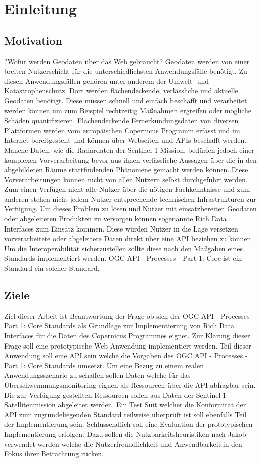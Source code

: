 \newpage
\restoregeometry
\section{Einleitung}
\subsection{Motivation}
?Wofür werden Geodaten über das Web gebraucht?
Geodaten werden von einer breiten Nutzerschicht für die unterschiedlichsten Anwendungsfälle benötigt.
Zu diesen Anwendungsfällen gehören unter anderem der Umwelt- und Katastrophenschutz. Dort werden flächendeckende,
verlässliche und aktuelle Geodaten benötigt. Diese müssen schnell und einfach beschafft und verarbeitet werden können
um zum Beispiel rechtzeitig Maßnahmen ergreifen oder mögliche Schäden quantifizieren. 
Flächendeckende Fernerkundungsdaten von diversen Plattformen werden vom europäischen Copernicus Programm 
erfasst und im Internet bereitgestellt und können über Webseiten und APIs beschafft werden. 
Manche Daten, wie die Radardaten der Sentinel-1 Mission, bedürfen jedoch einer komplexen Vorverarbeitung bevor aus ihnen verlässliche Aussagen über die in den 
abgebildeten Räume stattfindenden Phänomene gemacht werden können. 
Diese Vorverarbeitungen können nicht von allen Nutzern selbst durchgeführt werden. Zum einen Verfügen nicht alle Nutzer über die 
nötigen Fachkenntnisse und zum anderen stehen nicht jedem Nutzer entsprechende technischen Infrastrukturen zur Verfügung. 
Um dieses Problem zu lösen und Nutzer mit einsatzbereiten Geodaten oder abgeleiteten Produkten zu versorgen können sogenannte Rich Data Interfaces zum Einsatz kommen.  
Diese würden Nutzer in die Lage versetzen vorverarbeitete oder abgeleitete Daten direkt über eine API beziehen zu können.  
Um die Interoperabilität sicherzustellen sollte diese nach den Maßgaben eines Standards implementiert werden. OGC API - Processes - Part 1: Core ist ein 
Standard ein solcher Standard. 

\subsection{Ziele}
Ziel dieser Arbeit ist Beantwortung der Frage ob sich der OGC API - Processes - Part 1: Core Standards als Grundlage zur Implementierung von Rich Data Interfaces für die 
Daten des Copernicus Programmes eignet.  
Zur Klärung dieser Frage soll eine prototypische Web-Anwendung implementiert werden. 
Teil dieser Anwendung soll eine API sein welche die Vorgaben des OGC API - Processes - Part 1: Core Standards umsetzt. 
Um eine Bezug zu einem realen Anwendungsszenario zu schaffen sollen Daten welche für das Überschwemmungsmonitoring eignen als Ressourcen über die API abfragbar sein. 
Die zur Verfügung gestellten Ressourcen sollen aus Daten der Sentinel-1 Satellitenmission abgeleitet werden. Ein Test Suit welcher die Konformität 
der API zum zugrundeliegenden Standard teilweise überprüft ist soll ebenfalls Teil der Implementierung sein.
Schlussendlich soll eine Evaluation der prototypischen Implementierung erfolgen. Dazu sollen die Nutzbarkeitsheuristiken nach Jakob verwendet werden welche 
die Nutzerfreundlichkeit und Anwendbarkeit in den Fokus ihrer Betrachtung rücken.

